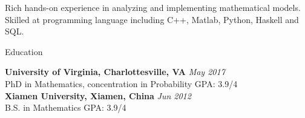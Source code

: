\documentclass{resume} %
\begin{document}
Rich hands-on experience in analyzing and implementing mathematical models. Skilled at programming language including C++, Matlab, Python, Haskell and SQL. 



\begin{rSection}{Education}

{\bf University of Virginia, Charlottesville, VA} \hfill {\em May 2017} \\ 
PhD in Mathematics, concentration in Probability \hspace{11mm}  GPA: 3.9/4  \\
{\bf Xiamen University, Xiamen, China} \hfill {\em Jun 2012} \\ 
B.S. in Mathematics \hspace{65mm} GPA: 3.9/4\\
\end{rSection}

\end{document}
